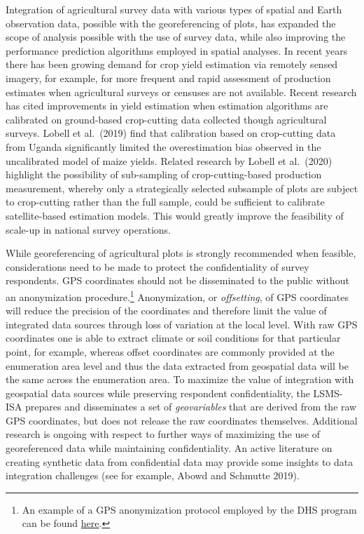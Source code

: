 \documentclass[
]{book}
\begin{document}
Integration of agricultural survey data with various types of spatial and Earth observation data, possible with the georeferencing of plots, has expanded the scope of analysis possible with the use of survey data, while also improving the performance prediction algorithms employed in spatial analyses. In recent years there has been growing demand for crop yield estimation via remotely sensed imagery, for example, for more frequent and rapid assessment of production estimates when agricultural surveys or censuses are not available. Recent research has cited improvements in yield estimation when estimation algorithms are calibrated on ground-based crop-cutting data collected though agricultural surveys. Lobell et al.~(2019) find that calibration based on crop-cutting data from Uganda significantly limited the overestimation bias observed in the uncalibrated model of maize yields. Related research by Lobell et al.~(2020) highlight the possibility of sub-sampling of crop-cutting-based production measurement, whereby only a strategically selected subsample of plots are subject to crop-cutting rather than the full sample, could be sufficient to calibrate satellite-based estimation models. This would greatly improve the feasibility of scale-up in national survey operations.

While georeferencing of agricultural plots is strongly recommended when feasible, considerations need to be made to protect the confidentiality of survey respondents. GPS coordinates should not be disseminated to the public without an anonymization procedure.\footnote{An example of a GPS anonymization protocol employed by the DHS program can be found \href{https://dhsprogram.com/What-We-Do/GPS-Data-Collection.cfm}{here}.} Anonymization, or \emph{offsetting}, of GPS coordinates will reduce the precision of the coordinates and therefore limit the value of integrated data sources through loss of variation at the local level. With raw GPS coordinates one is able to extract climate or soil conditions for that particular point, for example, whereas offset coordinates are commonly provided at the enumeration area level and thus the data extracted from geospatial data will be the same across the enumeration area. To maximize the value of integration with geospatial data sources while preserving respondent confidentiality, the LSMS-ISA prepares and disseminates a set of \emph{geovariables} that are derived from the raw GPS coordinates, but does not release the raw coordinates themselves. Additional research is ongoing with respect to further ways of maximizing the use of georeferenced data while maintaining confidentiality. An active literature on creating synthetic data from confidential data may provide some insights to data integration challenges (see for example, Abowd and Schmutte 2019).
\end{document}
